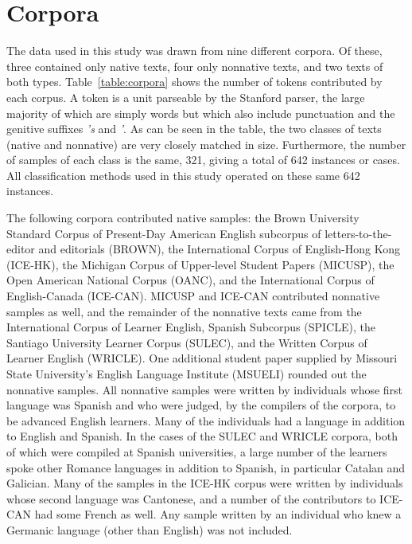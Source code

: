 \documentclass[main.tex]{subfiles}
\begin{document}
\section{Corpora}

The data used in this study was drawn from nine different corpora. Of these, three contained only native texts, four only nonnative texts, and two texts of both types. Table~\ref{table:corpora} shows the number of tokens contributed by each corpus. A token is a unit parseable by the Stanford parser, the large majority of which are simply words but which also include punctuation and the genitive suffixes \textit{'s} and \textit{'}. As can be seen in the table, the two classes of texts (native and nonnative) are very closely matched in size. Furthermore, the number of samples of each class is the same, 321, giving a total of 642 instances or cases. All classification methods used in this study operated on these same 642 instances.

The following corpora contributed native samples: the Brown University Standard Corpus of Present-Day American English subcorpus of letters-to-the-editor and editorials (BROWN), the International Corpus of English-Hong Kong (ICE-HK), the Michigan Corpus of Upper-level Student Papers (MICUSP), the Open American National Corpus (OANC), and the International Corpus of English-Canada (ICE-CAN). MICUSP and ICE-CAN contributed nonnative samples as well, and the remainder of the nonnative texts came from the International Corpus of Learner English, Spanish Subcorpus (SPICLE), the Santiago University Learner Corpus (SULEC), and the Written Corpus of Learner English (WRICLE). One additional student paper supplied by Missouri State University's English Language Institute (MSUELI) rounded out the nonnative samples. All nonnative samples were written by individuals whose first language was Spanish and who were judged, by the compilers of the corpora, to be advanced English learners. Many of the individuals had a language in addition to English and Spanish. In the cases of the SULEC and WRICLE corpora, both of which were compiled at Spanish universities, a large number of the learners spoke other Romance languages in addition to Spanish, in particular Catalan and Galician. Many of the samples in the ICE-HK corpus were written by individuals whose second language was Cantonese, and a number of the contributors to ICE-CAN had some French as well. Any sample written by an individual who knew a Germanic language (other than English) was not included.
\end{document}
